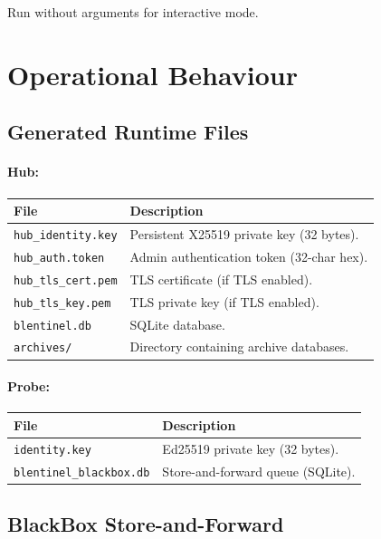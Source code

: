 \documentclass[12pt]{report}
\begin{document}
Run without arguments for interactive mode.

\section{Operational Behaviour}

\subsection{Generated Runtime Files}

\paragraph{Hub:}

\begin{longtable}{@{} l p{8cm} @{}}
\toprule
\textbf{File} & \textbf{Description} \\
\midrule
\texttt{hub\_identity.key} & Persistent X25519 private key (32 bytes). \\
\texttt{hub\_auth.token} & Admin authentication token (32-char hex). \\
\texttt{hub\_tls\_cert.pem} & TLS certificate (if TLS enabled). \\
\texttt{hub\_tls\_key.pem} & TLS private key (if TLS enabled). \\
\texttt{blentinel.db} & SQLite database. \\
\texttt{archives/} & Directory containing archive databases. \\
\bottomrule
\end{longtable}

\paragraph{Probe:}

\begin{longtable}{@{} l p{8cm} @{}}
\toprule
\textbf{File} & \textbf{Description} \\
\midrule
\texttt{identity.key} & Ed25519 private key (32 bytes). \\
\texttt{blentinel\_blackbox.db} & Store-and-forward queue (SQLite). \\
\bottomrule
\end{longtable}

\subsection{BlackBox Store-and-Forward}
\end{document}
